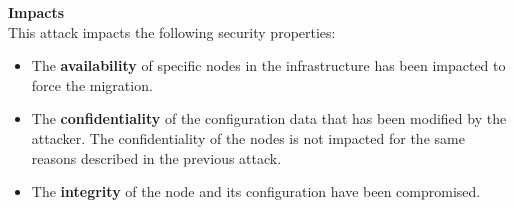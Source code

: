 \textbf{Impacts}\textbf{\\}
This attack impacts the following security properties:
\begin{itemize}
    \item The \textbf{availability} of specific nodes in the infrastructure has been impacted to force the migration.
    \item The \textbf{confidentiality} of the configuration data that has been modified by the attacker.
    The confidentiality of the nodes is not impacted for the same reasons described in the previous attack.
    \item The \textbf{integrity} of the node and its configuration have been compromised.





\end{itemize}
% 
\newpage